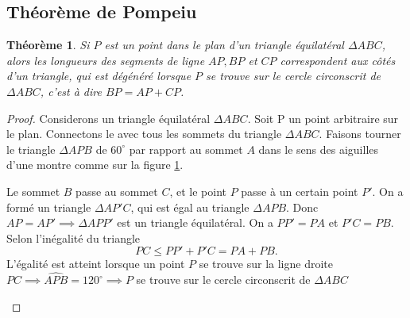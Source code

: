 \documentclass[10pt,a4paper]{article}%
\theoremstyle{theorem}
\newtheorem{theorem}{Théorème}
\theoremstyle{definition}
\begin{document}
			\subsection{Théorème de Pompeiu}
				\begin{theorem}
					Si $P$ est un point dans le plan d'un triangle équilatéral $\Delta ABC$, alors les longueurs des segments de ligne $AP, BP$ et $CP$ correspondent aux côtés d'un triangle, qui est dégénéré lorsque $P$ se trouve sur le cercle circonscrit de $\Delta ABC$, c'est à dire $BP=AP+CP$.
					
				\end{theorem}
			    	\begin{proof}
			    		Considerons un triangle équilatéral $\Delta ABC$. Soit P un point arbitraire sur le plan. Connectons le avec tous les sommets du triangle $\Delta ABC$. Faisons tourner le triangle $\Delta APB$ de $60^\circ$ par rapport au sommet $A$ dans le sens des aiguilles d'une montre comme sur la figure \ref{ris1.figure}.
			    		
			    		Le sommet $B$ passe au sommet $C$, et le point $P$ passe à un certain point $P'$. On a formé un triangle $\Delta AP'C$, qui est égal au triangle $\Delta APB$. Donc $AP=AP' \implies \Delta APP'$ est un triangle équilatéral. On a $PP'=PA$ et $P'C=PB$. Selon l'inégalité du triangle 
			    		\[PC\leq PP'+P'C=PA+PB.\]
			    		L'égalité est atteint lorsque un point $P$ se trouve sur la ligne droite $PC \implies \widehat{APB}=120^\circ \implies P$ se trouve sur le cercle circonscrit de $\Delta ABC$
			    		
			    		\begin{figure}[h]
			    			    		
			    		\begin{center}
			    		\end{center}
		    			\caption{}\label{ris1.figure}
		    			\end{figure}
			    		
			   		\end{proof}
\end{document}
